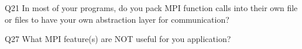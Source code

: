 \begin{description}%
\item{Q21} In most of your programs, do you pack MPI function calls into their own file or files to have your own abstraction layer for communication?%
\item{Q27} What MPI feature(s) are NOT useful for you application?%
\end{description}%
